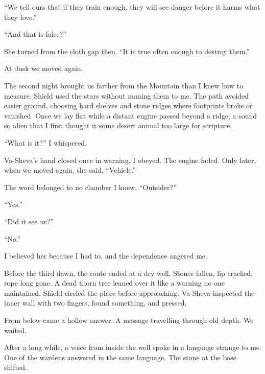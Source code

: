 ``We tell ours that if they train enough, they will see danger before it harms what they love.''\par

``And that is false?''\par

She turned from the cloth gap then. ``It is true often enough to destroy them.''\par

At dusk we moved again.\par

The second night brought us farther from the Mountain than I knew how to measure. Shield used the stars without naming them to me. The path avoided easier ground, choosing hard shelves and stone ridges where footprints broke or vanished. Once we lay flat while a distant engine passed beyond a ridge, a sound so alien that I first thought it some desert animal too large for scripture.\par

``What is it?'' I whispered.\par

Va-Sheva's hand closed once in warning. I obeyed. The engine faded. Only later, when we moved again, she said, ``Vehicle.''\par

The word belonged to no chamber I knew. ``Outsider?''\par

``Yes.''\par

``Did it see us?''\par

``No.''\par

I believed her because I had to, and the dependence angered me.\par

Before the third dawn, the route ended at a dry well. Stones fallen, lip cracked, rope long gone. A dead thorn tree leaned over it like a warning no one maintained. Shield circled the place before approaching. Va-Sheva inspected the inner wall with two fingers, found something, and pressed.\par

From below came a hollow answer. A message travelling through old depth. We waited.\par

After a long while, a voice from inside the well spoke in a language strange to me. One of the wardens answered in the same language. The stone at the base shifted.\par

